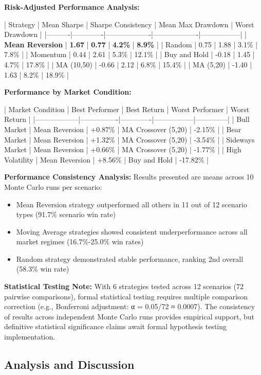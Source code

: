 \documentclass[11pt,a4paper]{article}
\begin{document}
\textbf{Risk-Adjusted Performance Analysis:}

| Strategy | Mean Sharpe | Sharpe Consistency | Mean Max Drawdown | Worst Drawdown |
|----------|-------------|-------------------|-------------------|-----------------|
| \textbf{Mean Reversion} | \textbf{1.67} | \textbf{0.77} | \textbf{4.2\%} | \textbf{8.9\%} |
| Random | 0.75 | 1.88 | 3.1\% | 7.8\% |
| Momentum | 0.44 | 2.61 | 5.3\% | 12.1\% |
| Buy and Hold | -0.18 | 1.45 | 4.7\% | 17.8\% |
| MA (10,50) | -0.66 | 2.12 | 6.8\% | 15.4\% |
| MA (5,20) | -1.40 | 1.63 | 8.2\% | 18.9\% |

\textbf{Performance by Market Condition:}

| Market Condition | Best Performer | Best Return | Worst Performer | Worst Return |
|------------------|----------------|-------------|-----------------|--------------|
| Bull Market | Mean Reversion | +0.87\% | MA Crossover (5,20) | -2.15\% |
| Bear Market | Mean Reversion | +1.32\% | MA Crossover (5,20) | -3.54\% |
| Sideways Market | Mean Reversion | +0.66\% | MA Crossover (5,20) | -1.77\% |
| High Volatility | Mean Reversion | +8.56\% | Buy and Hold | -17.82\% |

\textbf{Performance Consistency Analysis:}
Results presented are means across 10 Monte Carlo runs per scenario:
\begin{itemize}
\item Mean Reversion strategy outperformed all others in 11 out of 12 scenario types (91.7\% scenario win rate)
\item Moving Average strategies showed consistent underperformance across all market regimes (16.7\%-25.0\% win rates)
\item Random strategy demonstrated stable performance, ranking 2nd overall (58.3\% win rate)

\end{itemize}
\textbf{Statistical Testing Note:} With 6 strategies tested across 12 scenarios (72 pairwise comparisons), formal statistical testing requires multiple comparison correction (e.g., Bonferroni adjustment: α = 0.05/72 ≈ 0.0007). The consistency of results across independent Monte Carlo runs provides empirical support, but definitive statistical significance claims await formal hypothesis testing implementation.

\subsection{Analysis and Discussion}
\end{document}
